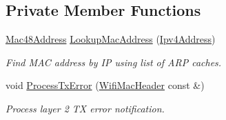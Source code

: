 \subsection*{Private Member Functions}
\begin{DoxyCompactItemize}
\item 
\hyperlink{classns3_1_1Mac48Address}{Mac48\+Address} \hyperlink{classns3_1_1aodv_1_1Neighbors_a0cbe6baaf85a2f8664806dc56f782c63}{Lookup\+Mac\+Address} (\hyperlink{classns3_1_1Ipv4Address}{Ipv4\+Address})
\begin{DoxyCompactList}\small\item\em Find M\+AC address by IP using list of A\+RP caches. \end{DoxyCompactList}\item 
void \hyperlink{classns3_1_1aodv_1_1Neighbors_ab236cbb6ca7911bb4f51d77662423868}{Process\+Tx\+Error} (\hyperlink{classns3_1_1WifiMacHeader}{Wifi\+Mac\+Header} const \&)
\begin{DoxyCompactList}\small\item\em Process layer 2 TX error notification. \end{DoxyCompactList}\end{DoxyCompactItemize}
